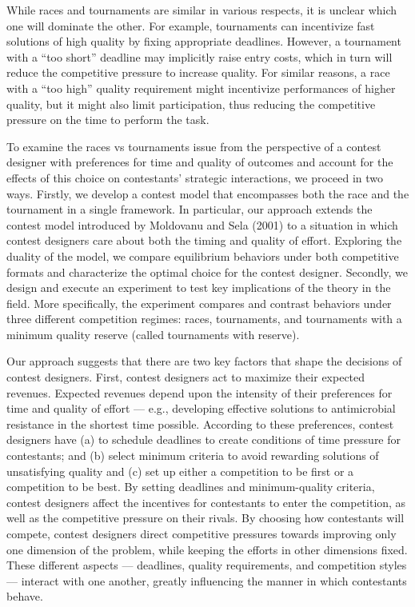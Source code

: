 \documentclass[11pt, titlepage]{article}
\begin{document}
While races and tournaments are similar in various respects, it is
unclear which one will dominate the other. For example, tournaments can
incentivize fast solutions of high quality by fixing appropriate
deadlines. However, a tournament with a ``too short'' deadline may
implicitly raise entry costs, which in turn will reduce the competitive
pressure to increase quality. For similar reasons, a race with a ``too
high'' quality requirement might incentivize performances of higher
quality, but it might also limit participation, thus reducing the
competitive pressure on the time to perform the task.

To examine the races vs tournaments issue from the perspective of a
contest designer with preferences for time and quality of outcomes and
account for the effects of this choice on contestants' strategic
interactions, we proceed in two ways. Firstly, we develop a contest
model that encompasses both the race and the tournament in a single
framework. In particular, our approach extends the contest model
introduced by Moldovanu and Sela (2001) to a situation in which contest
designers care about both the timing and quality of effort. Exploring
the duality of the model, we compare equilibrium behaviors under both
competitive formats and characterize the optimal choice for the contest
designer. Secondly, we design and execute an experiment to test key
implications of the theory in the field. More specifically, the
experiment compares and contrast behaviors under three different
competition regimes: races, tournaments, and tournaments with a minimum
quality reserve (called tournaments with reserve).

Our approach suggests that there are two key factors that shape the
decisions of contest designers. First, contest designers act to maximize
their expected revenues. Expected revenues depend upon the intensity of
their preferences for time and quality of effort --- e.g., developing
effective solutions to antimicrobial resistance in the shortest time
possible. According to these preferences, contest designers have (a) to
schedule deadlines to create conditions of time pressure for
contestants; and (b) select minimum criteria to avoid rewarding
solutions of unsatisfying quality and (c) set up either a competition to
be first or a competition to be best. By setting deadlines and
minimum-quality criteria, contest designers affect the incentives for
contestants to enter the competition, as well as the competitive
pressure on their rivals. By choosing how contestants will compete,
contest designers direct competitive pressures towards improving only
one dimension of the problem, while keeping the efforts in other
dimensions fixed. These different aspects --- deadlines, quality
requirements, and competition styles --- interact with one another,
greatly influencing the manner in which contestants behave.
\end{document}

